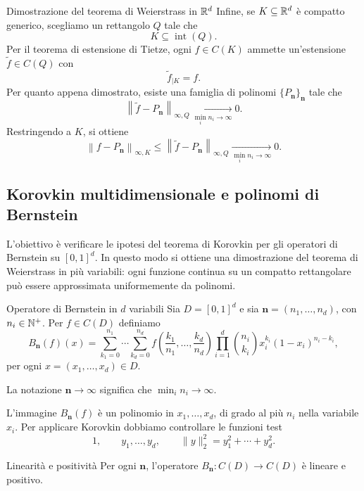 \documentclass[a4paper]{article}
\begin{document}
\begin{snippetproof}{Dimostrazione del teorema di Weierstrass in \(\mathbb{R}^d\)}
    Infine, se \(K\subseteq\mathbb{R}^d\) è compatto generico, scegliamo un rettangolo \(Q\) tale che
    \[
        K\subseteq \operatorname{int}(Q).
    \]
    Per il teorema di estensione di Tietze, ogni \(f\in C(K)\) ammette un'estensione \(\widetilde f\in C(Q)\) con
    \[
        \widetilde f_{\mid K}=f.
    \]
    Per quanto appena dimostrato, esiste una famiglia di polinomi \(\{P_{\mathbf n}\}_{\mathbf n}\) tale che
    \[
        \left\|\widetilde f-P_{\mathbf n}\right\|_{\infty,Q}
        \xrightarrow[\min_i n_i\to\infty]{}
        0.
    \]
    Restringendo a \(K\), si ottiene
    \[
        \left\|f-P_{\mathbf n}\right\|_{\infty,K}
        \leq
        \left\|\widetilde f-P_{\mathbf n}\right\|_{\infty,Q}
        \xrightarrow[\min_i n_i\to\infty]{}
        0.
    \]
\end{snippetproof}

\subsection{Korovkin multidimensionale e polinomi di Bernstein}

L'obiettivo è verificare le ipotesi del teorema di Korovkin per gli operatori di Bernstein su \([0,1]^d\). In questo modo si ottiene una dimostrazione del teorema di Weierstrass in più variabili: ogni funzione continua su un compatto rettangolare può essere approssimata uniformemente da polinomi.

\begin{snippetdefinition}{Operatore di Bernstein in \(d\) variabili}
    Sia \(D=[0,1]^d\) e sia \(\mathbf n=(n_1,\ldots,n_d)\), con \(n_i\in\mathbb{N}^+\). Per \(f\in C(D)\) definiamo
    \[
        B_{\mathbf n}(f)(x)
        =
        \sum_{k_1=0}^{n_1}\cdots\sum_{k_d=0}^{n_d}
        f\left(\frac{k_1}{n_1},\ldots,\frac{k_d}{n_d}\right)
        \prod_{i=1}^d \binom{n_i}{k_i}x_i^{k_i}(1-x_i)^{n_i-k_i},
    \]
    per ogni \(x=(x_1,\ldots,x_d)\in D\).

    La notazione \(\mathbf n\to\infty\) significa che \(\min_i n_i\to\infty\).
\end{snippetdefinition}

L'immagine \(B_{\mathbf n}(f)\) è un polinomio in \(x_1,\ldots,x_d\), di grado al più \(n_i\) nella variabile \(x_i\). Per applicare Korovkin dobbiamo controllare le funzioni test
\[
    1,\qquad y_1,\ldots,y_d,\qquad \|y\|_2^2=y_1^2+\cdots+y_d^2.
\]

\begin{snippetproposition}{Linearità e positività}
    Per ogni \(\mathbf n\), l'operatore \(B_{\mathbf n}:C(D)\to C(D)\) è lineare e positivo.
\end{snippetproposition}
\end{document}
